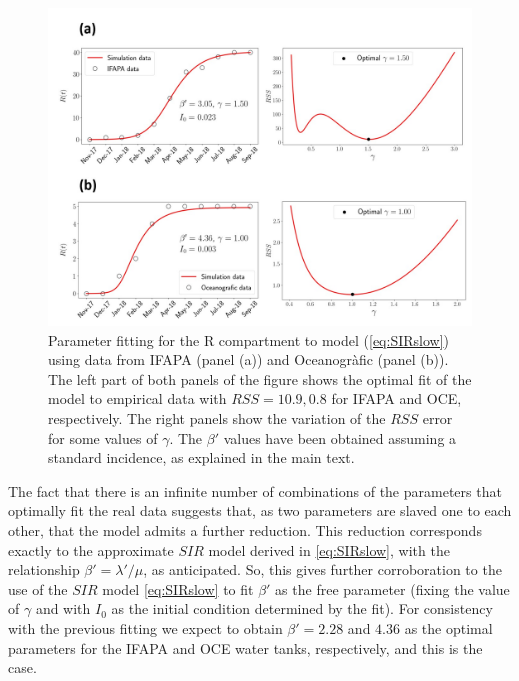 \begin{figure}[H]
    \centering
    \includegraphics[width=1\textwidth]{Figures/approx_SIR_fitting.jpg}
    \caption{Parameter fitting for the R compartment to model
        (\cref{eq:SIRslow}) using data from IFAPA (panel (a)) and Oceanogràfic
        (panel
        (b)). The left part of both panels of the figure shows the optimal fit
        of the
        model to empirical data with $RSS=10.9, 0.8$ for IFAPA and OCE,
        respectively.
        The right panels show the variation of the $RSS$ error for some values
        of
        $\gamma$.  The $\beta'$ values have been obtained assuming a standard
        incidence, as explained in the main text.}
    \label{fig:approx_SIR_fit}
\end{figure}

The fact that there is an infinite number of combinations of the parameters
that optimally fit the real data suggests that, as two parameters are slaved
one to each other, that the model
admits a further reduction. This reduction corresponds exactly to the
approximate $SIR$ model derived in \cref{eq:SIRslow}, with the relationship
$\beta'=\lambda'/\mu$, as anticipated. So, this gives further corroboration to
the use of the $SIR$ model \cref{eq:SIRslow} to fit $\beta'$ as the free
parameter (fixing the value of $\gamma$ and with $I_0$ as the initial condition
determined by the fit). For consistency with the previous fitting we expect to
obtain $\beta'=2.28$ and $4.36$ as the optimal parameters for the IFAPA and OCE
water tanks, respectively, and this is the case.

